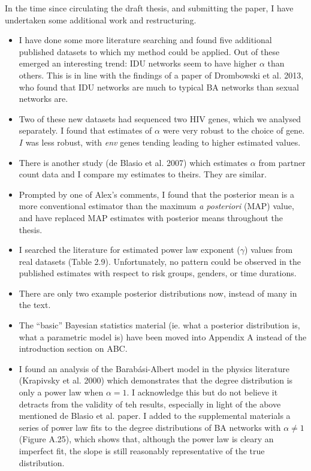 \documentclass[12pt]{article}
\begin{document}
\onehalfspacing

In the time since circulating the draft thesis, and submitting the paper, I
have undertaken some additional work and restructuring. \\

\begin{itemize}
  \item I have done some more literature searching and found five additional
    published datasets to which my method could be applied. Out of these
    emerged an interesting trend: IDU networks seem to have higher $\alpha$
    than others. This is in line with the findings of a paper of Drombowski et
    al. 2013, who found that IDU networks are much to typical BA networks than
    sexual networks are.
  \item Two of these new datasets had sequenced two HIV genes, which we
    analysed separately. I found that estimates of $\alpha$ were very robust
    to the choice of gene. $I$ was less robust, with \textit{env} genes tending
    leading to higher estimated values.
  \item There is another study (de Blasio et al. 2007) which estimates $\alpha$
    from partner count data and I compare my estimates to theirs. They are
    similar.
  \item Prompted by one of Alex's comments, I found that the posterior mean is
    a more conventional estimator than the maximum \textit{a posteriori} (MAP)
    value, and have replaced MAP estimates with posterior means throughout the
    thesis.
  \item I searched the literature for estimated power law exponent ($\gamma$)
    values from real datasets (Table 2.9). Unfortunately, no pattern could be
    observed in the published estimates with respect to risk groups, genders,
    or time durations. 
  \item There are only two example posterior distributions now, instead of
    many in the text.
  \item The ``basic'' Bayesian statistics material (ie. what a posterior
    distribution is, what a parametric model is) have been moved into Appendix
    A instead of the introduction section on ABC.
  \item I found an analysis of the Barab\'asi-Albert model in the physics
    literature (Krapivsky et al. 2000) which demonstrates that the degree
    distribution is only a power law when $\alpha = 1$. I acknowledge this but
    do not believe it detracts from the validity of teh results, especially in
    light of the above mentioned de Blasio et al. paper. I added to the
    supplemental materials a series of power law fits to the degree
    distributions of BA networks with $\alpha \neq 1$ (Figure A.25), which
    shows that, although the power law is cleary an imperfect fit, the slope
    is still reasonably representative of the true distribution.
\end{itemize}
\end{document}
